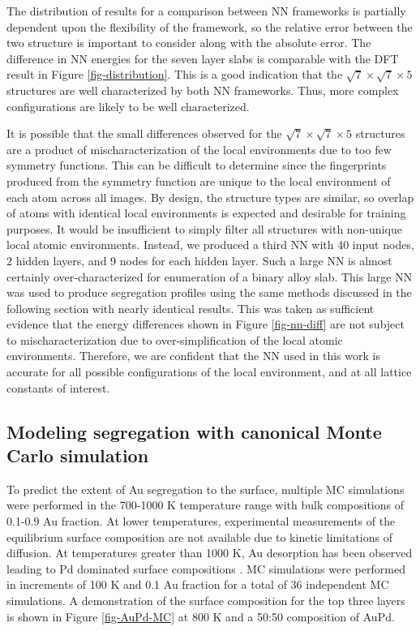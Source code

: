 \documentclass[12pt]{cmuthesis}
\begin{document}
The distribution of results for a comparison between NN frameworks is partially dependent upon the flexibility of the framework, so the relative error between the two structure is important to consider along with the absolute error. The difference in NN energies for the seven layer slabs is comparable with the DFT result in Figure \ref{fig-distribution}. This is a good indication that the \(\sqrt{7} \times \sqrt{7} \times 5\) structures are well characterized by both NN frameworks. Thus, more complex configurations are likely to be well characterized.

It is possible that the small differences observed for the \(\sqrt{7} \times \sqrt{7} \times 5\) structures are a product of mischaracterization of the local environments due to too few symmetry functions. This can be difficult to determine since the fingerprints produced from the symmetry function are unique to the local environment of each atom across all images. By design, the structure types are similar, so overlap of atoms with identical local environments is expected and desirable for training purposes. It would be insufficient to simply filter all structures with non-unique local atomic environments. Instead, we produced a third NN with 40 input nodes, 2 hidden layers, and 9 nodes for each hidden layer. Such a large NN is almost certainly over-characterized for enumeration of a binary alloy slab. This large NN was used to produce segregation profiles using the same methods discussed in the following section with nearly identical results. This was taken as sufficient evidence that the energy differences shown in Figure \ref{fig-nn-diff} are not subject to mischaracterization due to over-simplification of the local atomic environments. Therefore, we are confident that the NN used in this work is accurate for all possible configurations of the local environment, and at all lattice constants of interest.

\subsection{Modeling segregation with canonical Monte Carlo simulation}
\label{sec:org9e1533a}
To predict the extent of Au segregation to the surface, multiple MC simulations were performed in the 700-1000 K temperature range with bulk compositions of 0.1-0.9 Au fraction. At lower temperatures, experimental measurements of the equilibrium surface composition are not available due to kinetic limitations of diffusion. At temperatures greater than 1000 K, Au desorption has been observed leading to Pd dominated surface compositions \cite{yi-2005-compos-struc}. MC simulations were performed in increments of 100 K and 0.1 Au fraction for a total of 36 independent MC simulations. A demonstration of the surface composition for the top three layers is shown in Figure \ref{fig-AuPd-MC} at 800 K and a 50:50 composition of AuPd.
\end{document}
